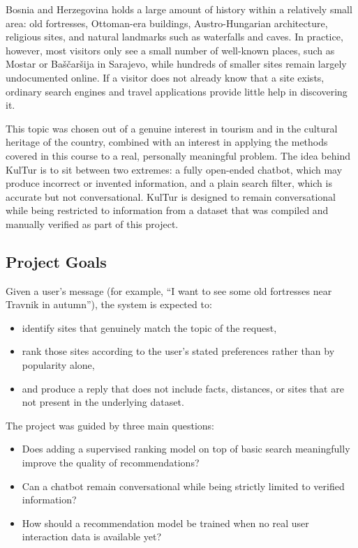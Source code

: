 \documentclass[conference]{IEEEtran}
\begin{document}
Bosnia and Herzegovina holds a large amount of history within a relatively small area: old fortresses, Ottoman-era buildings, Austro-Hungarian architecture, religious sites, and natural landmarks such as waterfalls and caves. In practice, however, most visitors only see a small number of well-known places, such as Mostar or Ba\v{s}\v{c}ar\v{s}ija in Sarajevo, while hundreds of smaller sites remain largely undocumented online. If a visitor does not already know that a site exists, ordinary search engines and travel applications provide little help in discovering it.

This topic was chosen out of a genuine interest in tourism and in the cultural heritage of the country, combined with an interest in applying the methods covered in this course to a real, personally meaningful problem. The idea behind KulTur is to sit between two extremes: a fully open-ended chatbot, which may produce incorrect or invented information, and a plain search filter, which is accurate but not conversational. KulTur is designed to remain conversational while being restricted to information from a dataset that was compiled and manually verified as part of this project.

\subsection{Project Goals}
Given a user's message (for example, ``I want to see some old fortresses near Travnik in autumn''), the system is expected to:
\begin{itemize}
\item identify sites that genuinely match the topic of the request,
\item rank those sites according to the user's stated preferences rather than by popularity alone,
\item and produce a reply that does not include facts, distances, or sites that are not present in the underlying dataset.
\end{itemize}

The project was guided by three main questions:
\begin{itemize}
\item Does adding a supervised ranking model on top of basic search meaningfully improve the quality of recommendations?
\item Can a chatbot remain conversational while being strictly limited to verified information?
\item How should a recommendation model be trained when no real user interaction data is available yet?
\end{itemize}
\end{document}
